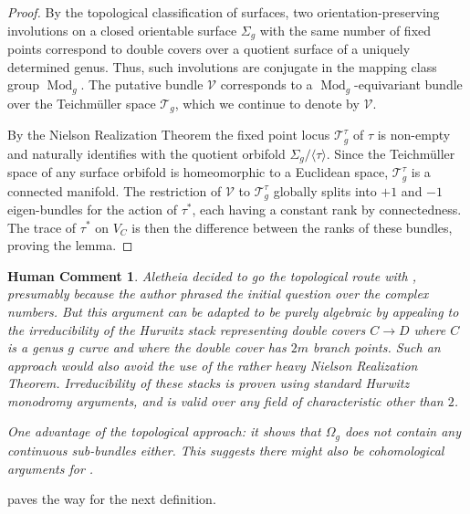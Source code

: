 \documentclass[reqno]{amsart}
\theoremstyle{plain}
\newtheorem{commentary}[theorem]{Human Comment}
\newcommand{\V}{\mathscr{V}}
\DeclareMathOperator{\Mod}{Mod}
\begin{document}
\begin{proof}
By the topological classification of surfaces, two orientation-preserving
involutions on a closed orientable surface $\Sigma_g$ with the same number of
fixed points correspond to double covers over a quotient surface of a uniquely
determined genus.  Thus, such involutions are conjugate in the mapping class
group $\Mod_{g}$.  The putative bundle $\V$ corresponds to a
$\Mod_g$-equivariant bundle over the Teichm\" uller space $\mathscr{T}_{g}$,
which we continue to denote by $\V$.  

By the Nielson Realization Theorem \cite{kerckhoff1983nielsen} the fixed point locus
$\mathscr{T}_{g}^{\tau}$ of $\tau$ is non-empty and naturally identifies with
the quotient orbifold $\Sigma_g / \langle\tau \rangle$.  Since the Teichm\"
uller space of any surface orbifold is homeomorphic to a Euclidean space,
$\mathscr{T}_{g}^\tau$ is a connected manifold.  The restriction of $\V$ to
$\mathscr{T}_{g}^{\tau}$ globally splits into $+1$ and $-1$ eigen-bundles for
the action of $\tau^{*}$, each having a constant rank by connectedness.  The trace of $\tau^{*}$ on $V_C$ is then
the difference between the ranks of these bundles, proving the lemma.

\end{proof} 

\begin{commentary}
  \label{commentary:hurwitzspaces} Aletheia decided to go the topological route
  with , presumably because the author
phrased the initial question over the complex numbers.  But this argument can be
adapted to be purely algebraic by appealing to the irreducibility of the Hurwitz
stack representing double covers $C \to D$ where $C$ is a genus $g$ curve and
where the double cover has $2m$ branch points. Such an approach would also avoid the use of
the rather heavy Nielson Realization Theorem. Irreducibility of these stacks is proven
using standard Hurwitz monodromy arguments, and is valid over any field of
characteristic other than $2$.  

One advantage of the topological approach: it shows that $\Omega_{g}$ does
not contain any \textit{continuous} sub-bundles either.  This suggests there might
also be cohomological arguments for . 
\end{commentary}




 paves the way for the next
definition.
\end{document}

